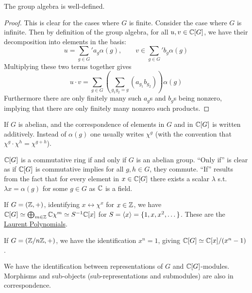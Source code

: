 \begin{proposition}
    The group algebra is well-defined.
\end{proposition}

\begin{proof}
    This is clear for the cases where $G$ is finite. Consider the case where $G$ is infinite. Then by definition of the group algebra, for all $u, v \in \mathbb{C}[G]$, we have their decomposition into elements in the basis:
    \[
        u = \sum_{g \in G}' a_g \alpha(g), \qquad v \in \sum_{g \in G}' b_g \alpha(g)
    \]
    Multiplying these two terms together gives
    \[
        u \cdot v = \sum_{g \in G} \left( \sum_{g_1 g_2 = g}  (a_{g_1} b_{g_2}) \right) \alpha(g)
    \]
    Furthermore there are only finitely many such $a_g$s and $b_g$s being nonzero, implying that there are only finitely many nonzero such products. 
\end{proof}

\begin{notation}
    If $G$ is abelian, and the correspondence of elements in $G$ and in $\mathbb{C}[G]$ is written additively. Instead of $\alpha(g)$ one usually writes $\chi^g$ (with the convention that $\chi^g \cdot \chi^h = \chi^{g + h}$).
\end{notation}

\begin{remark}
    $\mathbb{C}[G]$ is a commutative ring if and only if $G$ is an abelian group. ``Only if'' is clear as if $\mathbb{C}[G]$ is commutative implies for all $g, h \in G$, they commute. ``If'' results from the fact that for every element in $x \in \mathbb{C}[G]$ there exists a scalar $\lambda$ s.t. $\lambda x = \alpha(g)$ for some $g \in G$ as $\mathbb{C}$ is a field.
\end{remark}

\begin{example}
    If $G = (\mathbb{Z}, +)$, identifying $x \leftrightarrow \chi^x$ for $x \in \mathbb{Z}$, we have $\mathbb{C}[G] \simeq \bigoplus_{m\in \mathbb{Z}} \mathbb{C}\chi^m \simeq S^{-1}\mathbb{C}[x]$ for $S = \left\langle x \right\rangle = \{1, x, x^2, \dots\}$. These are the \underline{Laurent Polynomials}. 
    
    If $G = (\mathbb{Z}/n\mathbb{Z}, +)$, we have the identification $x^n = 1$, giving $\mathbb{C}[G] \simeq \mathbb{C}[x]/(x^n - 1)$.
\end{example}

\begin{proposition}\label{prop: repr of G identifiable with C[G]-modules}
    We have the identification between representations of $G$ and $\mathbb{C}[G]$-modules. Morphisms and sub-objects (sub-representations and submodules) are also in correspondence.
\end{proposition}

